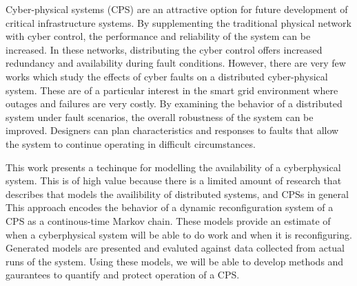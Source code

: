 
Cyber-physical systems (CPS) are an attractive option for future development of critical infrastructure systems.
By supplementing the traditional physical network with cyber control, the performance and reliability of the system can be increased.
In these networks, distributing the cyber control offers increased redundancy and availability during fault conditions.
However, there are very few works which study the effects of cyber faults on a  distributed cyber-physical system.
These are of a particular interest in the smart grid environment where outages and failures are very costly.
By examining the behavior of a distributed system under fault scenarios, the overall robustness of the system can be improved.
Designers can plan characteristics and responses to faults that allow the system to continue operating in difficult circumstances.

This work presents a techinque for modelling the availability of a cyberphysical system.
This is of high value because there is a limited amount of research that describes that models the availibility of distributed systems, and CPSs in general
This approach encodes the behavior of a dynamic reconfiguration system of a CPS as a continous-time Markov chain.
These models provide an estimate of when a cyberphysical system will be able to do work and when it is reconfiguring.
Generated models are presented and evaluted against data collected from actual runs of the system.
Using these models, we will be able to develop methods and gaurantees to quantify and protect operation of a CPS.
